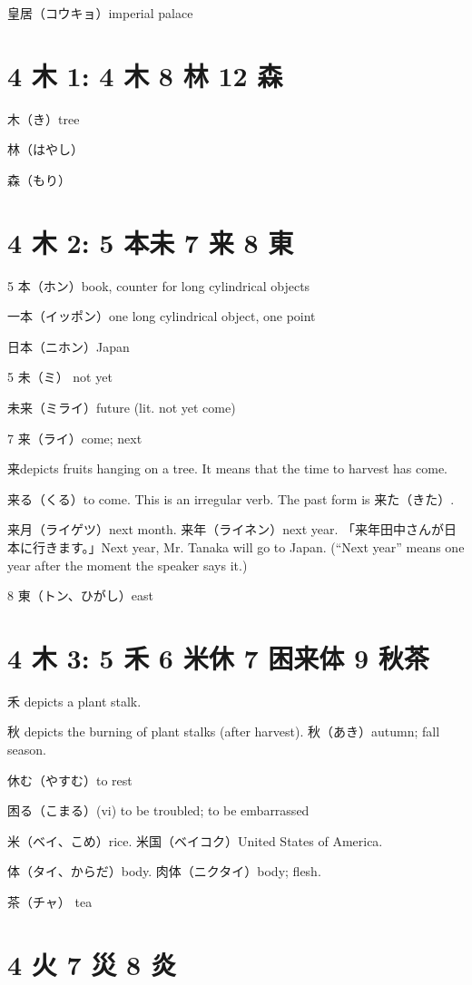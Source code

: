皇居（コウキョ）imperial palace

\section{4 木 1: 4 木 8 林 12 森}

木（き）tree

林（はやし）

森（もり）

\section{4 木 2: 5 本未 7 来 8 東}

5 本（ホン）book, counter for long cylindrical objects

一本（イッポン）one long cylindrical object, one point

日本（ニホン）Japan

5 未（ミ） not yet

未来（ミライ）future (lit. not yet come)

7 来（ライ）come; next

来depicts fruits hanging on a tree.
It means that the time to harvest has come.

来る（くる）to come. This is an irregular verb. The past form is 来た（きた）.

来月（ライゲツ）next month.
来年（ライネン）next year.
「来年田中さんが日本に行きます。」Next year, Mr. Tanaka will go to Japan.
(``Next year'' means one year after the moment the speaker says it.)

8 東（トン、ひがし）east

\section{4 木 3: 5 禾 6 米休 7 困来体 9 秋茶}

禾 depicts a plant stalk.

秋 depicts the burning of plant stalks (after harvest).
秋（あき）autumn; fall season.

休む（やすむ）to rest

困る（こまる）(vi) to be troubled; to be embarrassed

米（ベイ、こめ）rice.
米国（ベイコク）United States of America.

体（タイ、からだ）body.
肉体（ニクタイ）body; flesh.

茶（チャ） tea

\section{4 火 7 災 8 炎}

